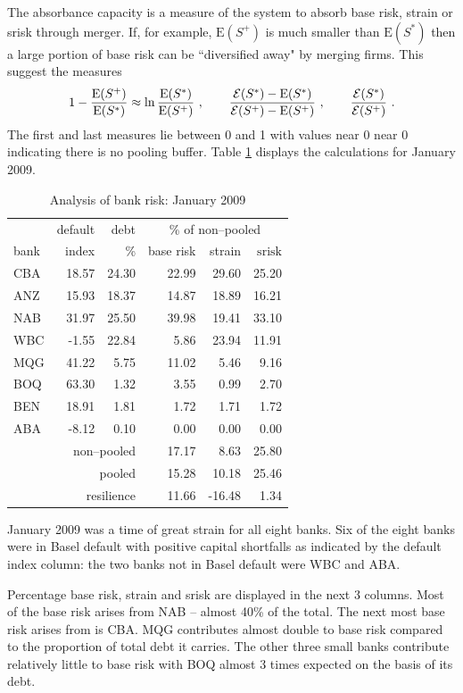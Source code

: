 \documentclass[authoryear]{elsarticle}
\newcommand{\E}{\mathrm{E}}
\newcommand{\Ex}{{\cal E}}
\newcommand{\tref}[1]{Table \ref{#1}}
\newcommand{\cq}{\ , \qquad}
\begin{document}
The absorbance capacity is a measure of the system to absorb base risk, strain or srisk through merger.   If, for example, $\E(S^+)$ is much smaller than $\E(S^*)$ then a large portion of base risk can be ``diversified away" by merging firms.   This suggest the measures
$$
1-\frac{\E(S^+)}{\E(S^*)}\approx\ln\frac{\E(S^*)}{\E(S^+)}\cq \frac{\Ex(S^*)-\E(S^*)}{\Ex(S^+)-\E(S^+)}\cq \frac{\Ex(S^*)}{\Ex(S^+)} \ .
$$
The first and last measures lie between 0 and 1 with values near 0 
 near 0 indicating there is no pooling buffer. \tref{jan2009} displays the calculations for January 2009.

\begin{table}[ht]
 \caption{Analysis of bank  risk:  January 2009}\label{jan2009}
\centering
\begin{tabular}{l|rr|rrr}
 \hline
 & default & debt & \multicolumn{3}{c}{\% of non--pooled}  \\ 
 \cline{4-6}
bank & index  & \% & base risk & strain & $\mathrm{srisk}$\\
\hline
CBA & 18.57 & 24.30 & 22.99 & 29.60 & 25.20 \\ 
  ANZ & 15.93 & 18.37 & 14.87 & 18.89 & 16.21 \\ 
  NAB & 31.97 & 25.50 & 39.98 & 19.41 & 33.10 \\ 
  WBC & -1.55 & 22.84 & 5.86 & 23.94 & 11.91 \\ 
  MQG & 41.22 & 5.75 & 11.02 & 5.46 & 9.16 \\ 
  BOQ & 63.30 & 1.32 & 3.55 & 0.99 & 2.70 \\ 
  BEN & 18.91 & 1.81 & 1.72 & 1.71 & 1.72 \\ 
  ABA & -8.12 & 0.10 & 0.00 & 0.00 & 0.00 \\ 
  \hline
  \multicolumn{3}{r|}{non--pooled}  & 17.17 & 8.63 & 25.80 \\ 
  \multicolumn{3}{r|}{pooled} & 15.28 & 10.18 & 25.46 \\ 
  \multicolumn{3}{r|}{resilience} & 11.66 & -16.48 & 1.34 \\ 
   \hline
\end{tabular}
\end{table}

January 2009 was a time of great strain for all eight banks.       Six of the eight banks were in Basel default with positive capital shortfalls as indicated by the default index column:   the two banks not in Basel default were WBC and ABA.    
 
 Percentage base risk, strain and srisk    are displayed in the next 3 columns.    Most of the base risk arises from NAB -- almost 40\% of the total.   The next most base risk arises from  is CBA.   MQG  contributes almost double to base risk compared to the proportion of total debt  it carries.  The other three small banks contribute relatively little to base risk with BOQ  almost 3 times expected on the basis of its debt.   
 
\end{document}
